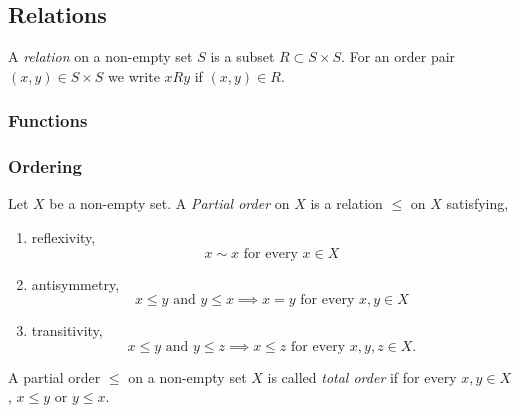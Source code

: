 \subsection{Relations}
\begin{definition}
    A \textit{relation} on a non-empty set $S$ is a subset $R\subset S\times S$. For an order pair $(x,y)\in S\times S$ we write $xRy$ if $(x,y)\in R$.     
\end{definition}

\subsubsection{Functions}
\subsubsection{Ordering}
\begin{definition}
    Let $X$ be a non-empty set. A \textit{Partial order} on $X$ is a relation $\leq$ on $X$ satisfying,
    \begin{enumerate}
        \item reflexivity,
        $$x\sim x \text{ for every } x \in X$$
        \item antisymmetry, 
        $$x\leq y \text{ and } y\leq x \implies x = y \text{ for every } x,y\in X$$
        \item transitivity, 
        $$x \leq y \text{ and } y \leq z \implies x \leq z \text{ for every } x,y,z\in X.$$
    \end{enumerate}
\end{definition}
\begin{definition}
    A partial order $\leq$ on a non-empty set $X$ is called \textit{total order} if for every $x,y\in X$, $x\leq y$ or $y\leq x$. 
\end{definition}
